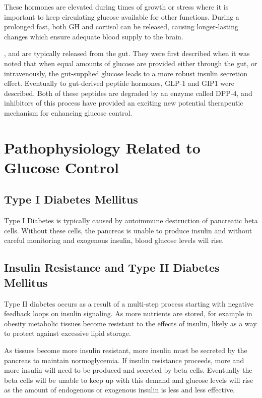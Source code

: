 \documentclass{tufte-handout}
\begin{document}
  These hormones are elevated during times of growth or stress where it is important to keep circulating glucose available for other functions.  During a prolonged fast, both GH and cortisol can be released, causing longer-lasting changes which ensure adequate blood supply to the brain.

, and are typically released from the gut.  They were first described when it was noted that when equal amounts of glucose are provided either through the gut, or intravenously, the gut-supplied glucose leads to a more robust insulin secretion effect.  Eventually to gut-derived peptide hormones, GLP-1 and GIP1 were described.  Both of these peptides are degraded by an enzyme called DPP-4, and inhibitors of this process have provided an exciting new potential therapeutic mechanism for enhancing glucose control.

\section{Pathophysiology Related to Glucose Control}

\subsection{Type I Diabetes Mellitus}

Type I Diabetes is typically caused by autoimmune destruction of pancreatic beta cells.  Without these cells, the pancreas is unable to produce insulin and without careful monitoring and exogenous insulin, blood glucose levels will rise.

\subsection{Insulin Resistance and Type II Diabetes Mellitus}

Type II diabetes occurs as a result of a multi-step process starting with negative feedback loops on insulin signaling.  As more nutrients are stored, for example in obesity metabolic tissues become resistant to the effects of insulin, likely as a way to protect against excessive lipid storage.  

As tissues become more insulin resistant, more insulin must be secreted by the pancreas to maintain normoglycemia.  If insulin resistance proceeds, more and more insulin will need to be produced and secreted by beta cells.  Eventually the beta cells will be unable to keep up with this demand and glucose levels will rise as the amount of endogenous or exogenous insulin is less and less effective.
\end{document}
